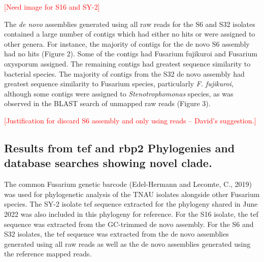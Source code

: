 \textcolor{red}{[Need image for S16 and SY-2]}

The \textit{de novo} assemblies generated using all raw reads for the S6 and S32 isolates contained a large number of contigs which had either no hits or were assigned to other genera. For instance, the majority of contigs for the de novo S6 assembly had no hits (Figure 2). Some of the contigs had Fusarium fujikuroi and Fusarium oxysporum assigned. The remaining contigs had greatest sequence similarity to bacterial species. The majority of contigs from the S32 de novo assembly had greatest sequence similarity to Fusarium species, particularly \textit{F. fujikuroi}, although some contigs were assigned to \textit{Stenotrophomonas} species, as was observed in the BLAST search of unmapped raw reads (Figure 3). 

\textcolor{red}{[Justification for discard S6 assembly and only using reads – David’s suggestion.]}



\subsection{Results from \acf{tef} and \acf{rbp2} Phylogenies and database searches showing novel clade.}

The common Fusarium genetic barcode (Edel-Hermann and Lecomte, C., 2019) was used for phylogenetic analysis of the TNAU isolates alongside other Fusarium species. The SY-2 isolate \ac{tef} sequence extracted for the phylogeny shared in June 2022 was also included in this phylogeny for reference. For the S16 isolate, the \ac{tef} sequence was extracted from the GC-trimmed de novo assembly. For the S6 and S32 isolates, the \ac{tef} sequence was extracted from the de novo assemblies generated using all raw reads as well as the de novo assemblies generated using the reference mapped reads. 


